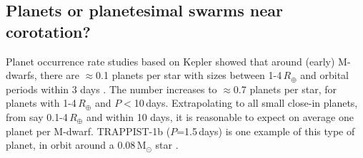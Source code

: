 \documentclass[11pt,twocolumn,tighten]{aastex63}
\begin{document}
%
%


\subsection{Planets or planetesimal swarms near corotation?}

Planet occurrence rate studies based on Kepler showed that around
(early) M-dwarfs, there are $\approx$0.1 planets per star with sizes
between 1-4\,$R_\oplus$ and orbital periods within 3 days
\citep{2015ApJ...807...45D}.  The number increases to $\approx$0.7
planets per star, for planets with 1-4\,$R_\oplus$ and $P$$<$10\,days.
Extrapolating to all small close-in planets, from say
0.1-4\,$R_\oplus$ and within 10 days, it is reasonable to expect on
average one planet per M-dwarf.  TRAPPIST-1b ($P$=1.5\,days) is one
example of this type of planet, in orbit around a 0.08\,M$_\odot$ star
\citep{2017Natur.542..456G}.
\end{document}
